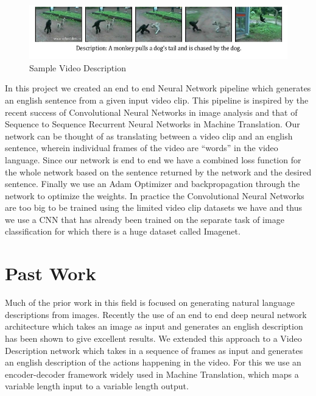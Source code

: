 \documentclass[12pt]{article}
\begin{document}
		\begin{figure}[ht!]
		\centering
		\includegraphics[width=1.0\textwidth]{description.png}
		\caption{Sample Video Description\label{fig0}}
		\end{figure}		
In this project we created an end to end Neural Network pipeline which generates an english sentence from a given input video clip. This pipeline is inspired by the recent success of Convolutional Neural Networks in image analysis and that of Sequence to Sequence Recurrent Neural Networks in Machine Translation. Our network can be thought of as translating between a video clip and an english sentence, wherein individual frames of the video are ``words'' in the video language. Since our network is end to end we have a combined loss function for the whole network based on the sentence returned by the network and the desired sentence. Finally we use an Adam Optimizer and backpropagation through the network to optimize the weights. In practice the Convolutional Neural Networks are too big to be trained using the limited video clip datasets we have and thus we use a CNN that has already been trained on the separate task of image classification for which there is a huge dataset called Imagenet.

	\section{Past Work}

		Much of the prior work in this field is focused on generating natural language descriptions from images. Recently the use of an end to end deep neural network architecture which takes an image as input and generates an english description has  been shown to give excellent results. We extended this approach to a Video Description network which takes in a sequence of frames as input and generates an english description of the actions happening in the video. For this we use an encoder-decoder framework widely used in Machine Translation, which maps a variable length input to a variable length output. 
\end{document}

